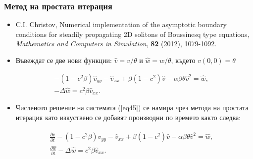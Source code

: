 \documentclass{beamer}
\newcommand{\rf}[1]{(\ref{#1})}
\begin{document}
\begin{frame}
\frametitle{Метод на простата итерация} 
\begin{itemize}
  \item C.I. Christov, Numerical implementation of the asymptotic boundary conditions for steadily propagating 2D solitons of Boussinesq type equations,
{\it Mathematics and Computers in Simulation}, \textbf{82} (2012), 1079-1092.
\end{itemize}

\begin{itemize}
  \item Въвеждат се две нови функции: $\widehat{v}=v/{\theta} $ и $\widehat{w}=w/{\theta} $, където $v(0,0)=\theta$
\end{itemize}
\begin{equation}\label{eq45}
\begin{split}
 &- (1 - c^2 \beta) \widehat{v}_{yy} -\widehat{v}_{xx} + \beta (1-c^2) \widehat{v} - \alpha \beta \theta \widehat{v}^2 = \widehat{w}, \\
 &- \Delta \widehat{w} =  c^2 \beta \widehat{v}_{xx}.
\end{split}
\end{equation}

\begin{itemize}
  \item Численото решение на системата \rf{eq45} се намира чрез метода на простата итерация като изкуствено се добавят производни по времето както следва:
\end{itemize}
\begin{align}\label{eq5}
\begin{split}
 &\frac {\partial \widehat{v}}{\partial t} - (1 - c^2 \beta) \widehat{v}_{yy} -\widehat{v}_{xx} + \beta (1-c^2) \widehat{v} - \alpha \beta \theta \widehat{v}^2 = \widehat{w}, \\
 &\frac {\partial \widehat{w}}{\partial t} - \Delta \widehat{w} =  c^2 \beta \widehat{v}_{xx}. 
\end{split}
\end{align}



\end{frame}
\end{document}

